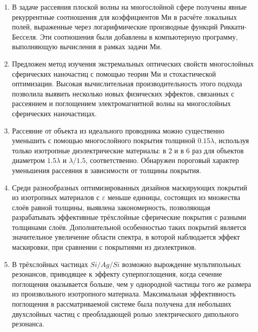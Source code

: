 \begin{enumerate}
  \item В задаче рассеяния плоской волны на многослойной сфере
    получены явные рекуррентные соотношения для коэффициентов Ми в
    расчёте локальных полей, выраженные через логарифмические
    производные функций Риккати-Бесселя.  Эти соотношения были
    добавлены в компьютерную программу, выполняющую вычисления в
    рамках задачи Ми.
  \item Предложен метод изучения экстремальных оптических свойств
    многослойных сферических наночастиц с помощью теории Ми и
    стохастической оптимизации. Высокая вычислительная
    производительность этого подхода позволила выявить несколько новых
    физических эффектов, связанных с рассеянием и поглощением
    электромагнитной волны на многослойных сферических наночастицах.
  \item Рассеяние от объекта из идеального проводника можно
    существенно уменьшить с помощью многослойного покрытия толщиной
    $0.15\lambda$, используя только изотропные диэлектрические
    материалы: в 2 и в 6 раз для объектов диаметром $1.5\lambda$ и
    $\lambda/1.5$, соответственно. Обнаружен пороговый характер
    уменьшения рассеяния в зависимости от толщины покрытия.
  \item %
    Среди разнообразных оптимизированных дизайнов маскирующих покрытий из
    изотропных материалов с $\varepsilon$ меньше единицы, состоящих из
    множества слоёв равной толщины, выявлена закономерность,
    позволяющая разрабатывать эффективные трёхслойные сферические
    покрытия с разными толщинами слоёв. Дополнительной особенностью
    таких покрытий является значительное увеличение области спектра, в
    которой наблюдается эффект маскировки, при сравнении с покрытиями
    из диэлектриков. 
  \item В трёхслойных частицах $Si/Ag/Si$ возможно вырождение
    мультипольных резонансов, приводящее к эффекту суперпоглощения,
    когда сечение поглощения оказывается больше, чем у однородной
    частицы того же размера из произвольного изотропного
    материала. Максимальная эффективность поглощения в
    рассматриваемой системе была получена для небольших двухслойных
    частиц с преобладающей ролью электрического дипольного резонанса.
\end{enumerate}
